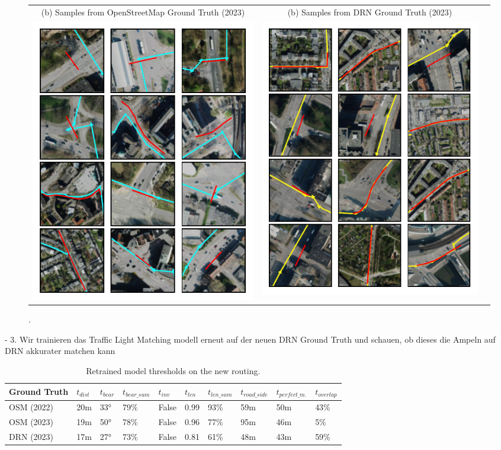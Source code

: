 \begin{figure}[htbp]
\centering 
\begin{tabular}{ccc}
\footnotesize{(b) Samples from OpenStreetMap Ground Truth (2023)} & \footnotesize{(b) Samples from DRN Ground Truth (2023)}  \\
\includegraphics[width=0.46\linewidth]{images/routing-lane-alignment-examples-osm.pdf} & \includegraphics[width=0.46\linewidth]{images/routing-lane-alignment-examples-drn.pdf} \\
\end{tabular}
\caption{.}
\label{fig:}
\end{figure}

- 3. Wir trainieren das Traffic Light Matching modell erneut auf der neuen DRN Ground Truth und schauen, ob dieses die Ampeln auf DRN akkurater matchen kann

\begin{table}[h]
\caption{Retrained model thresholds on the new routing.}
\begin{tabular}{@{}llllllllll@{}}
\toprule
  \textbf{Ground Truth} & $t_{dist}$ & $t_{bear}$ & $t_{bear\_sum}$ & $t_{inv}$ & $t_{len}$ & $t_{len\_sum}$ & $t_{road\_side}$ &  $t_{perfect\_m.}$ & $t_{overlap}$ \\
  \midrule
  OSM (2022) & 20m & 33° & 79\% & False & 0.99 & 93\% & 59m & 50m & 43\% \\
  OSM (2023) & 19m & 50° & 78\% & False & 0.96 & 77\% & 95m & 46m & 5\% \\
  DRN (2023) & 17m & 27° & 73\% & False & 0.81 & 61\% & 48m & 43m & 59\% \\
\bottomrule
\end{tabular}
\label{tab:hyperparameter-tuning-results-drn}
\end{table}

